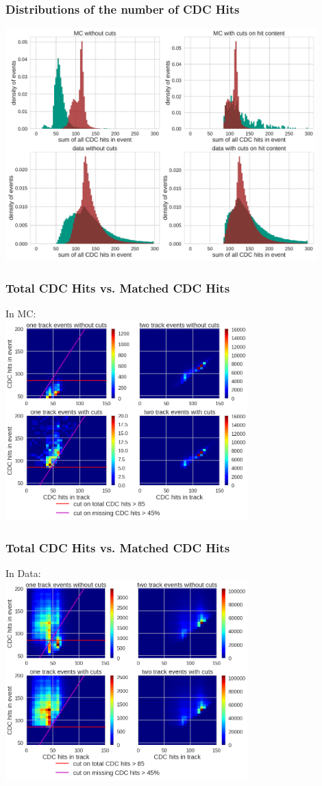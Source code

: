 \documentclass[18pt]{beamer}
\begin{document}
  \begin{frame}
    \frametitle{Distributions of the number of CDC Hits}
    \includegraphics[width=0.9\textwidth]{figures/hit_content_1dhistograms.pdf}
  \end{frame}

  \begin{frame}
    \frametitle{Total CDC Hits vs. Matched CDC Hits}
    \large In MC:\\
    \includegraphics[width=0.7\textwidth]{figures/hitcontent_2dhist_MC.png}
  \end{frame}

  \begin{frame}
    \frametitle{Total CDC Hits vs. Matched CDC Hits}
    \large In Data:\\
    \includegraphics[width=0.7\textwidth]{figures/hitcontent_2dhist_data.png}
  \end{frame}
\end{document}
